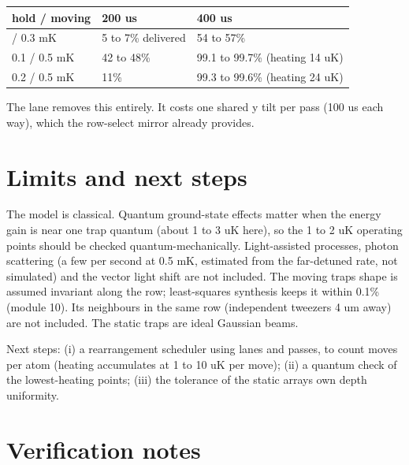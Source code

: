 {\small
\begin{longtable}[]{@{}lll@{}}
\toprule\noalign{}
hold / moving & 200 us & 400 us \\
\midrule\noalign{}
\endhead
\bottomrule\noalign{}
\endlastfoot
0.1 / 0.3 mK & 5 to 7\% delivered & 54 to 57\% \\
0.1 / 0.5 mK & 42 to 48\% & 99.1 to 99.7\% (heating 14 uK) \\
0.2 / 0.5 mK & 11\% & 99.3 to 99.6\% (heating 24 uK) \\
\end{longtable}
}

The lane removes this entirely. It costs one shared y tilt per pass (100
us each way), which the row-select mirror already provides.

\hypertarget{5-limits-and-next-steps}{%
\section{Limits and next steps}\label{transport3d-5-limits-and-next-steps}}

The model is classical. Quantum ground-state effects matter when the
energy gain is near one trap quantum (about 1 to 3 uK here), so the 1 to
2 uK operating points should be checked quantum-mechanically.
Light-assisted processes, photon scattering (a few per second at 0.5 mK,
estimated from the far-detuned rate, not simulated) and the vector light
shift are not included. The moving trap\textquotesingle s shape is
assumed invariant along the row; least-squares synthesis keeps it within
0.1\% (module 10). Its neighbours in the same row (independent tweezers
4 um away) are not included. The static traps are ideal Gaussian beams.

Next steps: (i) a rearrangement scheduler using lanes and passes, to
count moves per atom (heating accumulates at 1 to 10 uK per move); (ii)
a quantum check of the lowest-heating points; (iii) the tolerance of the
static array\textquotesingle s own depth uniformity.

\hypertarget{verification-notes}{%
\section{Verification notes}\label{transport3d-verification-notes}}

